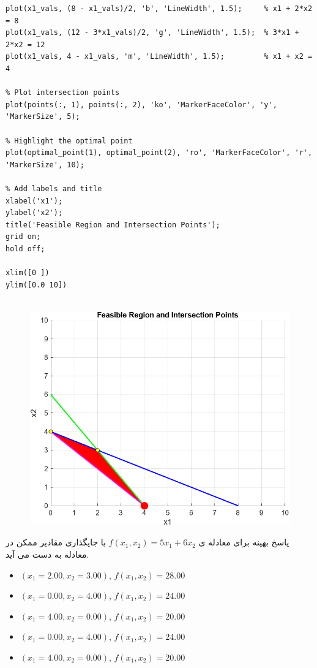 \begin{latin}
\begin{lstlisting}[frame=single,style=Matlab-Pyglike]
% Plot the lines representing the inequalities
plot(x1_vals, (8 - x1_vals)/2, 'b', 'LineWidth', 1.5);     % x1 + 2*x2 = 8
plot(x1_vals, (12 - 3*x1_vals)/2, 'g', 'LineWidth', 1.5);  % 3*x1 + 2*x2 = 12
plot(x1_vals, 4 - x1_vals, 'm', 'LineWidth', 1.5);         % x1 + x2 = 4

% Plot intersection points
plot(points(:, 1), points(:, 2), 'ko', 'MarkerFaceColor', 'y', 'MarkerSize', 5);

% Highlight the optimal point
plot(optimal_point(1), optimal_point(2), 'ro', 'MarkerFaceColor', 'r', 'MarkerSize', 10);

% Add labels and title
xlabel('x1');
ylabel('x2');
title('Feasible Region and Intersection Points');
grid on;
hold off;

xlim([0 ])
ylim([0.0 10])
		
	\end{lstlisting}
\end{latin}

\begin{figure}
	\centering
	\includegraphics[width=1\linewidth]{../img/Q1_1}
	\caption{}
	\label{fig:q11}
\end{figure}

پاسخ بهینه برای معادله ی 
	\( f(x_1, x_2) = 5x_1 + 6x_2 \)
با جایگذاری مقادیر ممکن در معادله به دست می آید.
	
	\begin{itemize}
		\item \( (x_1 = 2.00, x_2 = 3.00) \), \( f(x_1, x_2) = 28.00 \)
		\item \( (x_1 = 0.00, x_2 = 4.00) \), \( f(x_1, x_2) = 24.00 \)
		\item \( (x_1 = 4.00, x_2 = 0.00) \), \( f(x_1, x_2) = 20.00 \)
		\item \( (x_1 = 0.00, x_2 = 4.00) \), \( f(x_1, x_2) = 24.00 \)
		\item \( (x_1 = 4.00, x_2 = 0.00) \), \( f(x_1, x_2) = 20.00 \)
	\end{itemize}
	
